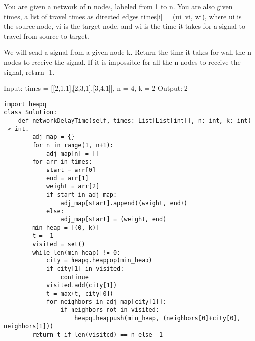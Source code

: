 \documentclass[24pt, a4]{article}
\begin{document}
You are given a network of n nodes, labeled from 1 to n. You are also given 
times, a list of travel times as directed edges times[i] = (ui, vi, wi), 
where ui is the source node, vi is the target node, and wi is the time 
it takes for a signal to travel from source to target.

We will send a signal from a given node k. Return the time it takes for 
wall the n nodes to receive the signal. If it is impossible for all the 
n nodes to receive the signal, return -1.

Input: times = [[2,1,1],[2,3,1],[3,4,1]], n = 4, k = 2
Output: 2
\begin{lstlisting}
import heapq
class Solution:
    def networkDelayTime(self, times: List[List[int]], n: int, k: int) -> int:
        adj_map = {}
        for n in range(1, n+1):
            adj_map[n] = []
        for arr in times:
            start = arr[0]
            end = arr[1]
            weight = arr[2]
            if start in adj_map:
                adj_map[start].append((weight, end))
            else:
                adj_map[start] = (weight, end)
        min_heap = [(0, k)]
        t = -1
        visited = set()
        while len(min_heap) != 0:
            city = heapq.heappop(min_heap)
            if city[1] in visited:
                continue
            visited.add(city[1])
            t = max(t, city[0])
            for neighbors in adj_map[city[1]]:
                if neighbors not in visited:
                    heapq.heappush(min_heap, (neighbors[0]+city[0], neighbors[1]))
        return t if len(visited) == n else -1
\end{lstlisting}
\newpage
\end{document}
